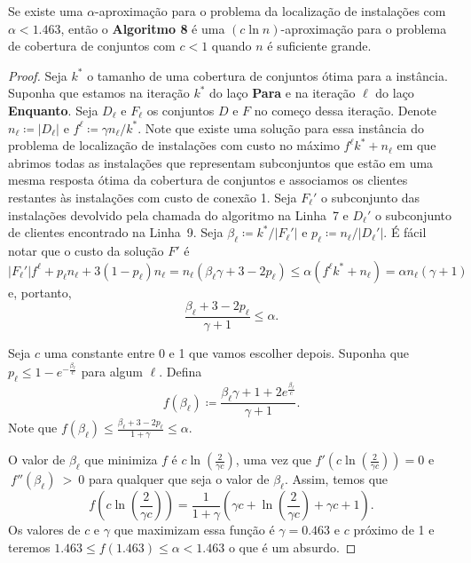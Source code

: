 \begin{theorem}
Se existe uma $\alpha$-aproximação para o problema da localização de instalações com $\alpha < 1.463$, então o {\bf Algoritmo 8} é uma $(c \ln n)$-aproximação para o problema de cobertura de conjuntos com $c<1$ quando $n$ é suficiente grande.
\end{theorem}

\begin{proof}
Seja $k^*$ o tamanho de uma cobertura de conjuntos ótima para a instância. Suponha que estamos na iteração $k^*$ do laço {\bf Para} e na iteração $\ell$ do laço {\bf Enquanto}.
Seja $D_\ell$ e $F_\ell$ os conjuntos $D$ e $F$ no começo dessa iteração. Denote $n_\ell \coloneqq |D_\ell|$ e $f^\ell \coloneqq \gamma n_\ell /k^*$. Note que existe uma solução para essa instância do problema de localização de instalações com custo no máximo $f^\ell k^* + n_\ell$ em que abrimos todas as instalações que representam subconjuntos que estão em uma mesma resposta ótima da cobertura de conjuntos e associamos os clientes restantes às instalações com custo de conexão 1.
Seja $F_\ell'$ o subconjunto das instalações devolvido pela chamada do algoritmo na Linha~7 e $D_\ell'$ o subconjunto de clientes encontrado na Linha~9. Seja $\beta_\ell \coloneqq k^*/|F_\ell'|$ e $p_\ell \coloneqq n_\ell / |D_\ell'|$. É fácil notar que o custo da solução $F'$ é
\[ |F_\ell'| f^\ell+ p_\ell n_\ell + 3 (1-p_\ell) n_\ell = n_\ell(\beta_\ell \gamma + 3 - 2p_\ell) \leq \alpha ( f^\ell k^* + n_\ell) = \alpha n_\ell (\gamma + 1)\]
e, portanto, 
\begin{equation} 
    \label{inaprox:beta}
\frac{\beta_\ell + 3 - 2p_\ell}{\gamma + 1} \leq \alpha.
\end{equation}

Seja $c$ uma constante entre 0 e 1 que vamos escolher depois. Suponha que $p_\ell \leq 1 - e^{-\frac{\beta_\ell}{c}}$ para algum $\ell$. Defina 
\[f(\beta_\ell) \coloneqq \frac{\beta_\ell \gamma + 1 + 2e^{\frac{\beta_\ell}{c}}}{\gamma + 1}.\]
Note que $f(\beta_\ell) \leq \frac{\beta_\ell + 3 - 2p_\ell}{1 + \gamma} \leq \alpha$.

O valor de $\beta_\ell$ que minimiza $f$ é $c\ln(\frac{2}{\gamma c})$, uma vez que $f'(c\ln(\frac{2}{\gamma c})) = 0$ e $~f''(\beta_\ell)~>~0$ para qualquer que seja o valor de $\beta_\ell$. Assim, temos que 
\[f(c\ln\left(\frac{2}{\gamma c}\right)) = \frac{1}{1+\gamma} \left( \gamma c + \ln\left(\frac{2}{\gamma c}\right) + \gamma c + 1 \right).\]
Os valores de $c$ e $\gamma$ que maximizam essa função é $\gamma = 0.463$ e $c$ próximo de 1 e teremos $1.463 \leq f(1.463) \leq \alpha < 1.463$ o que é um absurdo.


\end{proof}

